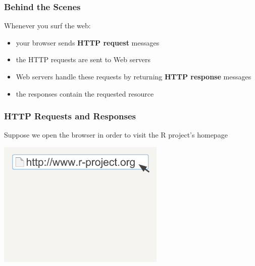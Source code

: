 \documentclass{beamer}\usepackage[]{graphicx}\usepackage[]{color}
\begin{document}
\begin{frame}
\frametitle{Behind the Scenes}

\begin{block}{Whenever you surf the web:}
\begin{itemize}
 \item your browser sends \textbf{HTTP request} messages \\
 \item the HTTP requests are sent to Web servers
 \item Web servers handle these requests by returning \textbf{HTTP response} messages
 \item the responses contain the requested resource
\end{itemize}
\end{block}

\end{frame}


\begin{frame}
\frametitle{HTTP Requests and Responses}

Suppose we open the browser in order to visit the R project's homepage

\begin{center}
\includegraphics[width=8cm]{images/web_request.pdf}
\end{center}

\end{frame}

\end{document}
